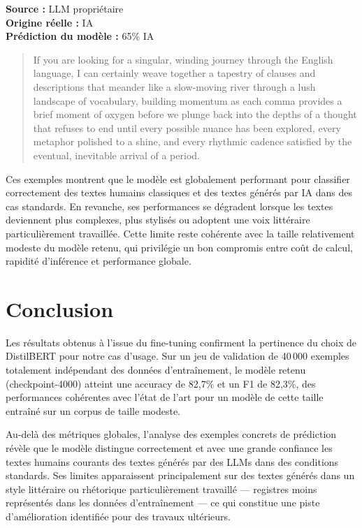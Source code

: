 ﻿\documentclass[12pt, a4paper]{report}
\begin{document}
\textbf{Source :} LLM propriétaire \\
\textbf{Origine réelle :} IA \\
\textbf{Prédiction du modèle :} 65\% IA

\begin{quote}
If you are looking for a singular, winding journey through the English
language, I can certainly weave together a tapestry of clauses and
descriptions that meander like a slow-moving river through a lush
landscape of vocabulary, building momentum as each comma provides a brief
moment of oxygen before we plunge back into the depths of a thought that
refuses to end until every possible nuance has been explored, every
metaphor polished to a shine, and every rhythmic cadence satisfied by the
eventual, inevitable arrival of a period.
\end{quote}

Ces exemples montrent que le modèle est globalement performant pour classifier
correctement des textes humains classiques et des textes générés par IA dans des
cas standards. En revanche, ses performances se dégradent lorsque les textes
deviennent plus complexes, plus stylisés ou adoptent une voix littéraire
particulièrement travaillée. Cette limite reste cohérente avec la taille
relativement modeste du modèle retenu, qui privilégie un bon compromis entre
coût de calcul, rapidité d'inférence et performance globale.

\section{Conclusion}

Les résultats obtenus à l'issue du fine-tuning confirment la pertinence du
choix de DistilBERT pour notre cas d'usage. Sur un jeu de validation de
40\,000 exemples totalement indépendant des données d'entraînement, le
modèle retenu (checkpoint-4000) atteint une accuracy de 82,7\% et un F1
de 82,3\%, des performances cohérentes avec l'état de l'art pour un modèle
de cette taille entraîné sur un corpus de taille modeste.

Au-delà des métriques globales, l'analyse des exemples concrets de
prédiction révèle que le modèle distingue correctement et avec une grande
confiance les textes humains courants des textes générés par des LLMs dans
des conditions standards. Ses limites apparaissent principalement sur des
textes générés dans un style littéraire ou rhétorique particulièrement
travaillé — registres moins représentés dans les données d'entraînement —
ce qui constitue une piste d'amélioration identifiée pour des travaux
ultérieurs.
\end{document}
